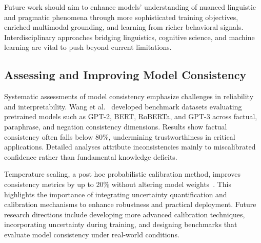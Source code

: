\documentclass[sigconf]{acmart}
\begin{document}
Future work should aim to enhance models' understanding of nuanced linguistic and pragmatic phenomena through more sophisticated training objectives, enriched multimodal grounding, and learning from richer behavioral signals. Interdisciplinary approaches bridging linguistics, cognitive science, and machine learning are vital to push beyond current limitations.

\subsection{Assessing and Improving Model Consistency}

Systematic assessments of model consistency emphasize challenges in reliability and interpretability. Wang et al.~\cite{ref35} developed benchmark datasets evaluating pretrained models such as GPT-2, BERT, RoBERTa, and GPT-3 across factual, paraphrase, and negation consistency dimensions. Results show factual consistency often falls below 80\%, undermining trustworthiness in critical applications. Detailed analyses attribute inconsistencies mainly to miscalibrated confidence rather than fundamental knowledge deficits.

Temperature scaling, a post hoc probabilistic calibration method, improves consistency metrics by up to 20\% without altering model weights~\cite{ref35}. This highlights the importance of integrating uncertainty quantification and calibration mechanisms to enhance robustness and practical deployment. Future research directions include developing more advanced calibration techniques, incorporating uncertainty during training, and designing benchmarks that evaluate model consistency under real-world conditions.
\end{document}
